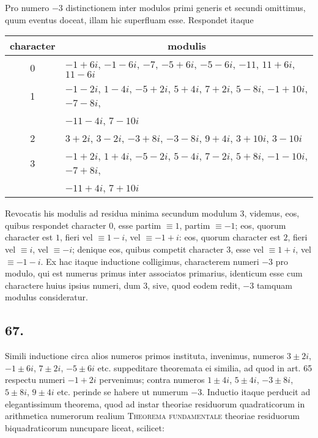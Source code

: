 \documentclass[twoside,12pt, showframe]{memoir}
\begin{document}
Pro numero \(-3\) distinctionem inter modulos primi generis et secundi omittimus, quum eventus doceat, illam hic superfluam esse. Respondet itaque\clearpage\noindent%
\begin{center}
\begin{tabular}{c|l}
character & \multicolumn{1}{c}{modulis} \\
\hline
0 & \(-1+6 i\), \(-1-6 i\), \(-7\), \(-5+6 i\), \(-5-6 i\), \(-11\), \(11+6 i\), \( 11-6 i\) \\
1 & \(-1-2 i\), \( 1-4 i\), \(-5+2 i\), \( 5+4 i\), \( 7+2 i\), \( 5-8 i\), \(-1+10 i\), \(-7-8 i\),  \\
 & \quad \(-11-4 i\), \( 7-10 i\) \\
2 & \(3+2 i\), \( 3-2 i\), \(-3+8 i\), \(-3-8 i\), \( 9+4 i\), \( 3+10 i\), \( 3-10 i\) \\
3 & \(-1+2 i\), \( 1+4 i\), \(-5-2 i\), \( 5-4 i\), \( 7-2 i\), \( 5+8 i\), \(-1-10 i\), \(-7+8 i\), \\
 & \quad \(-11+4 i\), \( 7+10 i\) \\
\end{tabular}
\end{center}
 
Revocatis his modulis ad residua minima secundum modulum \(3\), videmus, eos, quibus respondet character \(0\), esse partim \(\equiv 1\), partim \(\equiv-1\); eos, quorum character est \(1\), fieri vel \(\equiv 1-i\), vel \(\equiv-1+i\): eos, quorum character est \(2\), fieri vel \(\equiv i\), vel \(\equiv-i\); denique eos, quibus competit character \(3\), esse vel \(\equiv 1+i\), vel \(\equiv-1-i\). Ex hac itaque inductione colligimus, characterem numeri \(-3\) pro modulo, qui est numerus primus inter associatos primarius, identicum esse cum charactere huius ipsius numeri, dum \(3\), sive, quod eodem redit, \(-3\) tamquam modulus consideratur.

\subsection*{67.}
 
Simili inductione circa alios numeros primos instituta, invenimus, numeros \(3 \pm 2 i\), \(-1 \pm 6 i\), \( 7 \pm 2 i\), \(-5 \pm 6 i\) etc. suppeditare theoremata ei similia, ad quod in art. 65 respectu numeri \(-1+2 i\) pervenimus; contra numeros \(1 \pm 4 i\), \( 5 \pm 4 i\), \(-3 \pm 8 i\), \( 5 \pm 8 i\), \( 9 \pm 4 i\) etc. perinde se habere ut numerum \(-3\). Inductio itaque perducit ad elegantissimum theorema, quod ad instar theoriae residuorum quadraticorum in arithmetica numerorum realium \textsc{Theorema fundamentale} theoriae residuorum biquadraticorum nuncupare liceat, scilicet:
 
\end{document}
